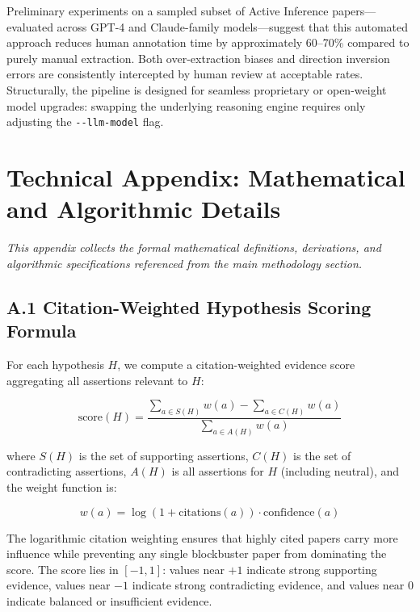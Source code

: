 \documentclass[
]{article}
\begin{document}
Preliminary experiments on a sampled subset of Active Inference
papers---evaluated across GPT-4 and Claude-family models---suggest that
this automated approach reduces human annotation time by approximately
60--70\% compared to purely manual extraction. Both over-extraction
biases and direction inversion errors are consistently intercepted by
human review at acceptable rates. Structurally, the pipeline is designed
for seamless proprietary or open-weight model upgrades: swapping the
underlying reasoning engine requires only adjusting the
\texttt{-\/-llm-model} flag.

\newpage

\section{\texorpdfstring{Technical Appendix: Mathematical and
Algorithmic Details
\label{sec:technical_appendix}}{Technical Appendix: Mathematical and Algorithmic Details }}\label{technical-appendix-mathematical-and-algorithmic-details}

\emph{This appendix collects the formal mathematical definitions,
derivations, and algorithmic specifications referenced from the main
methodology section.}

\subsection{A.1 Citation-Weighted Hypothesis Scoring
Formula}\label{a.1-citation-weighted-hypothesis-scoring-formula}

For each hypothesis \(H\), we compute a citation-weighted evidence score
aggregating all assertions relevant to \(H\):

\[
\text{score}(H) = \frac{\sum_{a \in S(H)} w(a) - \sum_{a \in C(H)} w(a)}{\sum_{a \in A(H)} w(a)}
\]

where \(S(H)\) is the set of supporting assertions, \(C(H)\) is the set
of contradicting assertions, \(A(H)\) is all assertions for \(H\)
(including neutral), and the weight function is:

\[
w(a) = \log(1 + \text{citations}(a)) \cdot \text{confidence}(a)
\]

The logarithmic citation weighting ensures that highly cited papers
carry more influence while preventing any single blockbuster paper from
dominating the score. The score lies in \([-1, 1]\): values near \(+1\)
indicate strong supporting evidence, values near \(-1\) indicate strong
contradicting evidence, and values near \(0\) indicate balanced or
insufficient evidence.
\end{document}
